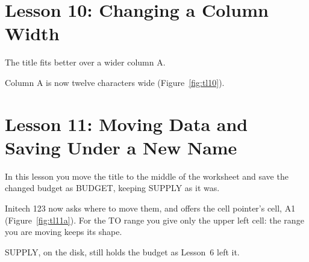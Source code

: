 \section{Lesson 10: Changing a Column Width}
The title fits better over a wider column A.

\begin{Keystrokes}
\end{Keystrokes}
Column A is now twelve characters wide (Figure~\ref{fig:tl10}).

\section{Lesson 11: Moving Data and Saving Under a New Name}
In this lesson you move the title to the middle of the worksheet and save
the changed budget as BUDGET, keeping SUPPLY as it was.

\begin{Keystrokes}
\end{Keystrokes}
Initech 123 now asks where to move them, and offers the cell pointer's
cell, A1 (Figure~\ref{fig:tl11a}).  For the TO range you give only the
upper left cell: the range you are moving keeps its shape.
\begin{Keystrokes}
\end{Keystrokes}
\begin{Keystrokes}
\end{Keystrokes}
SUPPLY, on the disk, still holds the budget as Lesson~6 left it.
